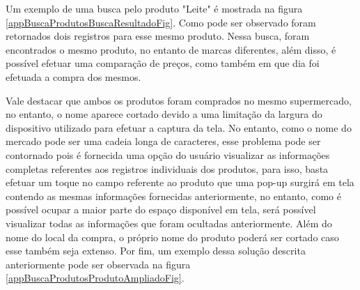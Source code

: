 Um exemplo de uma busca pelo produto "Leite" é mostrada na figura \ref{appBuscaProdutosBuscaResultadoFig}. Como pode ser observado foram retornados dois registros para esse mesmo produto. Nessa busca, foram encontrados o mesmo produto, no entanto de marcas diferentes, além disso, é possível efetuar uma comparação de preços, como também em que dia foi efetuada a compra dos mesmos.

Vale destacar que ambos os produtos foram comprados no mesmo supermercado, no entanto, o nome aparece cortado devido a uma limitação da largura do dispositivo utilizado para efetuar a captura da tela. No entanto, como o nome do mercado pode ser uma cadeia longa de caracteres, esse problema pode ser contornado pois é fornecida uma opção do usuário visualizar as informações completas referentes aos registros individuais dos produtos, para isso, basta efetuar um toque no campo referente ao produto que uma pop-up surgirá em tela contendo as mesmas informações fornecidas anteriormente, no entanto, 
como é possível ocupar a maior parte do espaço disponível em tela, será possível visualizar todas as informações que foram ocultadas anteriormente. Além do nome do local da compra, o próprio nome do produto poderá ser cortado caso esse também seja extenso. Por fim, um exemplo dessa solução descrita anteriormente pode ser observada na figura \ref{appBuscaProdutosProdutoAmpliadoFig}.

